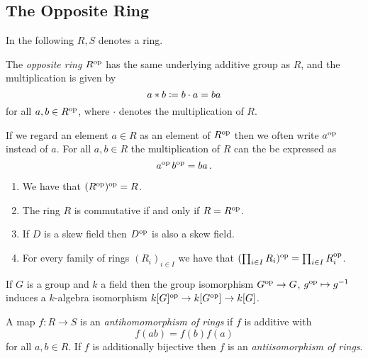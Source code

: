 \subsection{The Opposite Ring}
\label{appendix: the opposite ring}


\begin{conventions}
  In the following $R, S$ denotes a ring.
\end{conventions}


\begin{definition}
  The \emph{opposite ring} $R^{\operatorname{op}}$ has the same underlying additive group as $R$, and the multiplication is given by
  \[
              a * b
    \coloneqq  b \cdot a
    =         ba
  \]
  for all $a, b \in R^{\operatorname{op}}$, where $\cdot$ denotes the multiplication of $R$.
\end{definition}


\begin{notation}
  If we regard an element $a \in R$ as an element of $R^{\operatorname{op}}$ then we often write $a^{{\operatorname{op}}}$ instead of $a$.
  For all $a, b \in R$ the multiplication of $R$ can the be expressed as
  \[
      a^{\operatorname{op}} \, b^{\operatorname{op}}
    = b a \,.
  \]
\end{notation}


\begin{lemma}
  \label{remark: basic properties of op}
  \leavevmode
  \begin{enumerate}
    \item
      We have that $( R^{\operatorname{op}} )^{\operatorname{op}} = R$.
    \item
      The ring $R$ is commutative if and only if $R = R^{\operatorname{op}}$.
    \item
      If $D$ is a skew field then $D^{\operatorname{op}}$ is also a skew field.
    \item
      For every family of rings $(R_i)_{i \in I}$ we have that $( \prod_{i \in I} R_i )^{\operatorname{op}} = \prod_{i \in I} R_i^{\operatorname{op}}$.
  \end{enumerate}
\end{lemma}


\begin{example}
  If $G$ is a group and $k$ a field then the group isomorphism $G^{\operatorname{op}} \to G$, $g^{\operatorname{op}} \mapsto g^{-1}$ induces a $k$-algebra isomorphism $k[G]^{\operatorname{op}} \to k[G^{\operatorname{op}}] \to k[G]$.
\end{example}


\begin{definition}
  A map $f \colon R \to S$ is an \emph{antihomomorphism of rings} if $f$ is additive with
  \[
    f(a b) = f(b) f(a)
  \]
  for all $a, b \in R$.
  If $f$ is additionally bijective then $f$ is an \emph{antiisomorphism of rings}.
\end{definition}


